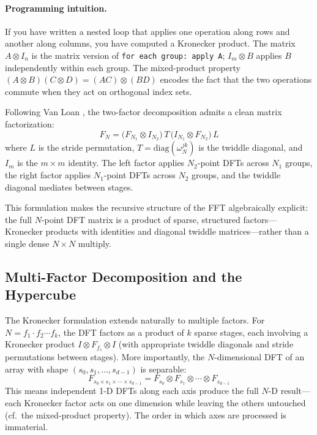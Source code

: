 \documentclass[12pt,a4paper]{report}
\theoremstyle{thms}
\theoremstyle{defns}
\begin{document}
\paragraph{Programming intuition.} If you have written a nested loop that applies one operation along rows and another along columns, you have computed a Kronecker product. The matrix $A \otimes I_n$ is the matrix version of \texttt{for each group: apply A}; $I_m \otimes B$ applies $B$ independently within each group. The mixed-product property $(A \otimes B)(C \otimes D) = (AC) \otimes (BD)$ encodes the fact that the two operations commute when they act on orthogonal index sets.

Following Van Loan \cite{van_loan_fft}, the two-factor decomposition admits a clean matrix factorization:
\begin{equation}
    F_N = \bigl(F_{N_1} \otimes I_{N_2}\bigr)\, T\, \bigl(I_{N_1} \otimes F_{N_2}\bigr)\, L
    \label{eq:kron_fft}
\end{equation}
where $L$ is the stride permutation, $T = \mathrm{diag}(\omega_N^{jk})$ is the twiddle diagonal, and $I_m$ is the $m \times m$ identity. The left factor applies $N_2$-point DFTs across $N_1$ groups, the right factor applies $N_1$-point DFTs across $N_2$ groups, and the twiddle diagonal mediates between stages.

This formulation makes the recursive structure of the FFT algebraically explicit: the full $N$-point DFT matrix is a product of sparse, structured factors—Kronecker products with identities and diagonal twiddle matrices—rather than a single dense $N \times N$ multiply.

\subsection{Multi-Factor Decomposition and the Hypercube}
\label{sec:nd_fft}

The Kronecker formulation extends naturally to multiple factors. For $N = f_1 \cdot f_2 \cdots f_k$, the DFT factors as a product of $k$ sparse stages, each involving a Kronecker product $I \otimes F_{f_s} \otimes I$ (with appropriate twiddle diagonals and stride permutations between stages). More importantly, the $N$-dimensional DFT of an array with shape $(s_0, s_1, \ldots, s_{d-1})$ is separable:
\begin{equation}
    F_{s_0 \times s_1 \times \cdots \times s_{d-1}} = F_{s_0} \otimes F_{s_1} \otimes \cdots \otimes F_{s_{d-1}}
\end{equation}
This means independent 1-D DFTs along each axis produce the full $N$-D result—each Kronecker factor acts on one dimension while leaving the others untouched (cf.\ the mixed-product property). The order in which axes are processed is immaterial.
\end{document}
